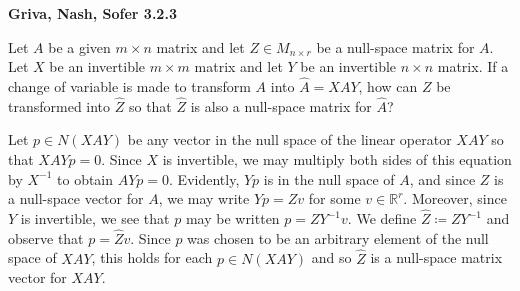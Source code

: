 \textbf{Griva, Nash, Sofer 3.2.3}

Let $A$ be a given $m \times n$ matrix and let $Z \in M_{n \times r}$ be a null-space matrix for $A$. Let $X$ be an 
invertible $m \times m$ matrix and let $Y$ be an invertible $n \times n$ matrix. If a change of variable is made to 
transform $A$ into $\hat{A} = XAY$, how can $Z$ be transformed into $\hat{Z}$ so that $\hat{Z}$ is also a null-space 
matrix for $\hat{A}$?

\begin{solution}
  Let $p \in N(XAY)$ be any vector in the null space of the linear operator $XAY$ so that $XAYp = 0$. Since $X$ is 
  invertible, we may multiply both sides of this equation by $X^{-1}$ to obtain $AYp = 0$. Evidently, $Yp$ is in the 
  null space of $A$, and since $Z$ is a null-space vector for $A$, we may write $Yp = Zv$ for some 
  $v \in \mathbb{R}^r$. Moreover, since $Y$ is invertible, we see that $p$ may be written $p = ZY^{-1}v$. We define
  $\hat{Z} \coloneqq ZY^{-1}$ and observe that $p = \hat{Z}v$. Since $p$ was chosen to be an arbitrary element of the
  null space of $XAY$, this holds for each $p \in N(XAY)$ and so $\hat{Z}$ is a null-space matrix vector for $XAY$.
  \ \\
\end{solution}